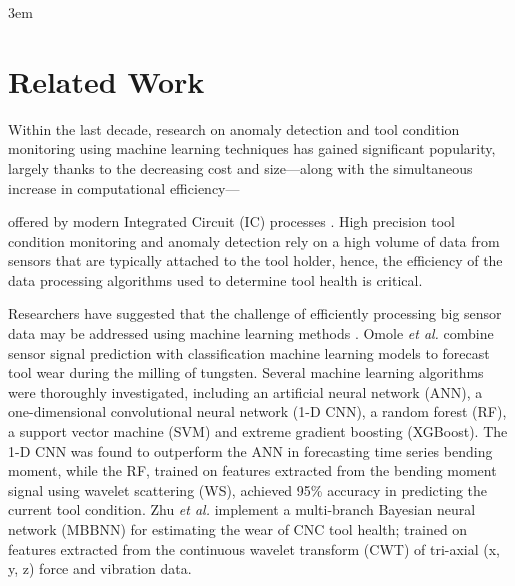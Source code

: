 \documentclass[../main.tex]{subfiles}
\begin{document}
\emergencystretch 3em

\twocolumn

\section{Related Work}





Within the last decade, research on anomaly detection and tool condition monitoring using machine learning techniques has gained significant popularity, largely thanks to the decreasing cost and size---along 
with the simultaneous increase in computational efficiency---

offered by modern Integrated Circuit (IC) processes \cite{RN21}\cite{RN22}. High precision tool condition monitoring and anomaly detection rely on a high volume of data from sensors that are typically attached to the tool holder, hence, the efficiency of the data processing algorithms used to determine tool health is critical. 

Researchers have suggested that the challenge of efficiently processing big sensor data may be addressed using machine learning methods \cite{RN23}. Omole \textit{et al.} \cite{RN18} combine sensor signal prediction with classification machine learning models to forecast tool wear during the milling of tungsten. Several machine learning algorithms were thoroughly investigated, including an artificial neural network (ANN), a one-dimensional convolutional neural network (1-D CNN), a random forest (RF), a support vector machine (SVM) and extreme gradient boosting (XGBoost). The 1-D CNN was found to outperform the ANN in forecasting time series bending moment, while the RF, trained on features extracted from the bending moment signal using wavelet scattering (WS), achieved 95\% accuracy in predicting the current tool condition. Zhu \textit{et al.} \cite{RN13} implement a multi-branch Bayesian neural network (MBBNN) for estimating the wear of CNC tool health; trained on features extracted from the continuous wavelet transform (CWT) of tri-axial (x, y, z) force and vibration data. 
\end{document}
